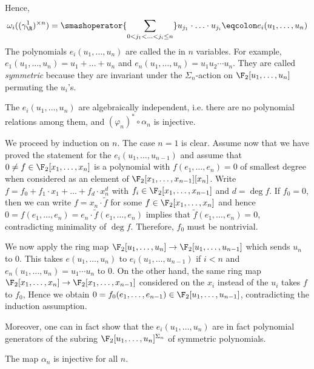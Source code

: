 Hence, 
\begin{equation*}
	\omega_i((\gamma_\R^1)^{\times n}) = \smashoperator{\sum_{0 < j_1 < \ldots < j_i \leq n}} u_{j_1} \cdot \ldots \cdot u_{j_i} \eqcolon e_i(u_1, \ldots, u_n)
\end{equation*}
The polynomials $e_i(u_1, \ldots, u_n)$ are called the  in $n$ variables.
For example, $e_1(u_1, \ldots, u_n) = u_1 + \ldots + u_n$ and $e_n(u_1, \ldots, u_n) = u_1 u_2 \cdots u_n$.
They are called \emph{symmetric} because they are invariant under the $\Sigma_n$-action on $\F_2[u_1, \ldots, u_n]$ permuting the $u_i$'s.
\begin{proposition}
	The $e_i(u_1, \ldots, u_n)$ are algebraically independent, i.e. there are no polynomial relations among them, and $(\varphi_n)^* \circ \alpha_n$ is injective.
\end{proposition}
\begin{smallproof}
	We proceed by induction on $n$.
	The case $n = 1$ is clear.
	Assume now that we have proved the statement for the $e_i(u_1, \ldots, u_{n - 1})$ and assume that $0 \neq f \in \F_2[x_1, \ldots, x_n]$ is a polynomial with $f(e_1, \ldots, e_n) = 0$ of smallest degree when considered as an element of $\F_2[x_1, \ldots, x_{n - 1}][x_n]$.
	Write $f = f_0 + f_1 \cdot x_1 + \ldots + f_d \cdot x_n^d$ with $f_i \in \F_2[x_1, \ldots, x_{n - 1}]$ and $d = \deg f$.
	If $f_0 = 0$, then we can write $f = x_n \cdot \tilde{f}$ for some $f \in \F_2[x_1, \ldots, x_n]$ and hence $0 = f(e_1, \ldots, e_n) = e_n \cdot \tilde{f}(e_1, \ldots, e_n)$ implies that $\tilde{f}(e_1, \ldots, e_n) = 0$, contradicting minimality of $\deg f$.
	Therefore, $f_0$ must be nontrivial.

	We now apply the ring map $\F_2[u_1, \ldots, u_n] \to \F_2[u_1, \ldots, u_{n - 1}]$ which sends $u_n$ to 0.
	This takes $e(u_1, \ldots, u_n)$ to $e_i(u_1, \ldots, u_{n - 1})$ if $i < n$ and $e_n(u_1, \ldots, u_n) = u_1 \cdots u_n$ to 0.
	On the other hand, the same ring map $\F_2[x_1, \ldots, x_n] \to \F_2[x_1, \ldots, x_{n - 1}]$ considered on the $x_i$ instead of the $u_i$ takes $f$ to $f_0$, 
	Hence we obtain $0 = f_0(e_1, \ldots, e_{n - 1}) \in \F_2[u_1, \ldots, u_{n - 1}]$, contradicting the induction assumption.
\end{smallproof}
Moreover, one can in fact show that the $e_i(u_1, \ldots, u_n)$ are in fact polynomial generators of the subring $\F_2[u_1, \ldots, u_n]^{\Sigma_n}$ of symmetric polynomials.
\begin{corollary}
	The map $\alpha_n$ is injective for all $n$.
\end{corollary}
